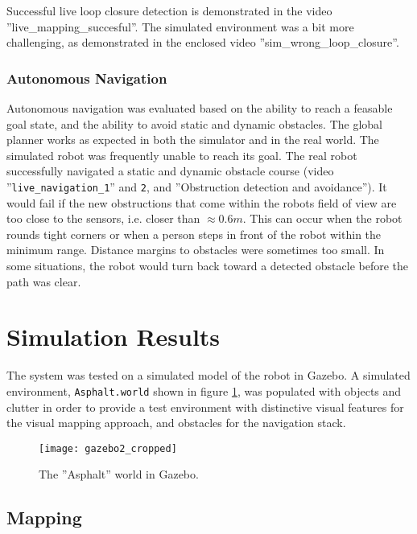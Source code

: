 Successful live loop closure detection is demonstrated in the video ''live\_mapping\_succesful''. The simulated environment was a bit more challenging, as demonstrated in the enclosed video ''sim\_wrong\_loop\_closure''.

\subsubsection{Autonomous Navigation}

Autonomous navigation was evaluated based on the ability to reach a feasable goal state, and the ability to avoid static and dynamic obstacles. The global planner works as expected in both the simulator and in the real world. The simulated robot was frequently unable to reach its goal. The real robot successfully navigated a static and dynamic obstacle course (video ''\texttt{live\_navigation\_1}'' and \texttt{2}, and ''Obstruction detection and avoidance''). It would fail if the new obstructions that come within the robots field of view are too close to the sensors, i.e. closer than $\approx 0.6m $. This can occur when the robot rounds tight corners or when a person steps in front of the robot within the minimum range. Distance margins to obstacles were sometimes too small. In some situations, the robot would turn back toward a detected obstacle before the path was clear.



\section{Simulation Results}

The system was tested on a simulated model of the robot in Gazebo. A simulated environment, \texttt{Asphalt.world} shown in figure \ref{fig:gazebo2_cropped}, was populated with objects and clutter in order to provide a test environment with distinctive visual features for the visual mapping approach, and obstacles for the navigation stack. 

\begin{figure}[h]
	\centering
	\texttt{[image: gazebo2\_cropped]}
	\caption{The ''Asphalt'' world in Gazebo. }
	\label{fig:gazebo2_cropped}
\end{figure}

\subsection{Mapping}

